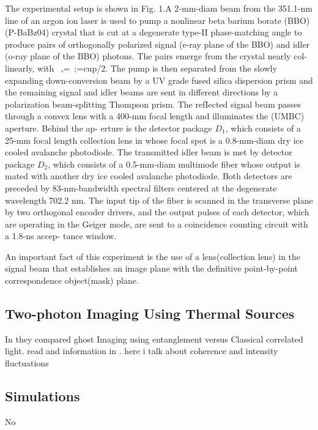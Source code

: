 The experimental setup is shown in Fig. 1.A 2-mm-diam beam from the 351.1-nm 
line of an argon ion laser is used to pump a nonlinear beta barium borate (BBO)
(P-BaBz04) crystal that is cut at a degenerate type-II phase-matching angle to produce 
pairs of orthogonally polarized signal (e-ray plane of the BBO) and idler (o-ray plane 
of the BBO) photons. The pairs emerge from the crystal nearly col- linearly, 
with ~,=~;=cup/2. The pump is then separated from the slowly expanding 
down-conversion beam by a UV grade fused silica dispersion prism and the 
remaining signal and idler beams are sent in different directions by a polarization 
beam-splitting Thompson prism. The refIected signal beam passes through a 
convex lens with a 400-mm focal length and illuminates the (UMBC) aperture. 
Behind the ap- erture is the detector package $D_1$, which consists of a 25-mm 
focal length collection lens in whose focal spot is a 0.8-mm-diam dry ice 
cooled avalanche photodiode. The transmitted idler beam is met by detector 
package $D_2$, which consists of a 0.5-mm-diam multimode fiber whose output is 
mated with another dry ice cooled avalanche photodiode. Both detectors are 
preceded by 83-nm-bandwidth spectral filters centered at the degenerate 
wavelength 702.2 nm. The input tip of the fiber is scanned in the transverse 
plane by two orthogonal encoder drivers, and the output pulses of each 
detector, which are operating in the Geiger mode, are sent to a coincidence 
counting circuit with a 1.8-ns accep- tance window.


An important fact of this experiment is the use of a lens(collection lens) in the signal beam that establishes an image plane with the definitive point-by-point correspondence object(mask) plane.




\subsection{Two-photon Imaging Using Thermal Sources}

In \cite{thermal} they compared ghost Imaging using entanglement versus Classical correlated light. read and information in \cite{thermalAlejandra}. here i talk about coherence and intensity fluctuations \cite{intensity}

\subsection{Simulations}

No\cite{simulated}



